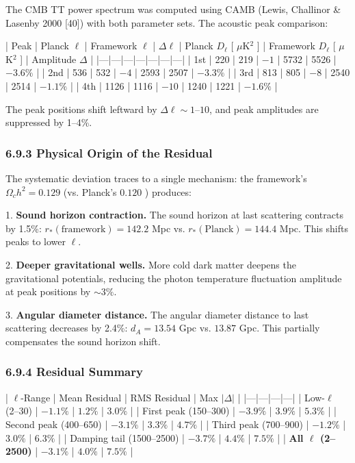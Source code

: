 \documentclass[11pt,a4paper]{article}
\theoremstyle{definition}
\theoremstyle{remark}
\begin{document}
The CMB TT power spectrum was computed using CAMB (Lewis, Challinor \& Lasenby 2000 [40]) with both parameter sets. The acoustic peak comparison:

| Peak | Planck $\ell$ | Framework $\ell$ | $\Delta\ell$ | Planck $D_\ell$ [ $\mu$K$^2$ ] | Framework $D_\ell$ [ $\mu$K$^2$ ] | Amplitude $\Delta$ |
|---|---|---|---|---|---|---|
| 1st | 220 | 219 | $-1$ | 5732 | 5526 | $-3.6\%$ |
| 2nd | 536 | 532 | $-4$ | 2593 | 2507 | $-3.3\%$ |
| 3rd | 813 | 805 | $-8$ | 2540 | 2514 | $-1.1\%$ |
| 4th | 1126 | 1116 | $-10$ | 1240 | 1221 | $-1.6\%$ |

The peak positions shift leftward by $\Delta\ell \sim 1$–$10$, and peak amplitudes are suppressed by 1–4\%.

\subsubsection{6.9.3 Physical Origin of the Residual}

The systematic deviation traces to a single mechanism: the framework's $\Omega_c h^2 = 0.129$ (vs. Planck's $0.120$ ) produces:

1. \textbf{Sound horizon contraction.} The sound horizon at last scattering contracts by 1.5\%: $r_*({\text{framework}}) = 142.2$ Mpc vs. $r_*({\text{Planck}}) = 144.4$ Mpc. This shifts peaks to lower $\ell$.

2. \textbf{Deeper gravitational wells.} More cold dark matter deepens the gravitational potentials, reducing the photon temperature fluctuation amplitude at peak positions by $\sim 3\%$.

3. \textbf{Angular diameter distance.} The angular diameter distance to last scattering decreases by 2.4\%: $d_A = 13.54$ Gpc vs. $13.87$ Gpc. This partially compensates the sound horizon shift.

\subsubsection{6.9.4 Residual Summary}

| $\ell$-Range | Mean Residual | RMS Residual | Max $|\Delta|$ |
|---|---|---|---|
| Low-$\ell$ (2–30) | $-1.1\%$ | $1.2\%$ | $3.0\%$ |
| First peak (150–300) | $-3.9\%$ | $3.9\%$ | $5.3\%$ |
| Second peak (400–650) | $-3.1\%$ | $3.3\%$ | $4.7\%$ |
| Third peak (700–900) | $-1.2\%$ | $3.0\%$ | $6.3\%$ |
| Damping tail (1500–2500) | $-3.7\%$ | $4.4\%$ | $7.5\%$ |
| \textbf{All $\ell$ (2–2500)} | \textbf{$-3.1\%$} | \textbf{$4.0\%$} | \textbf{$7.5\%$} |
\end{document}
